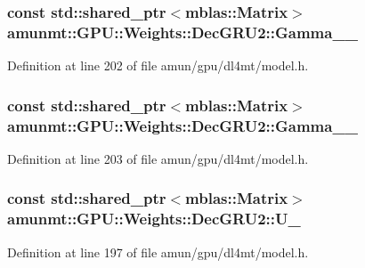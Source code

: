 \subsubsection[{\texorpdfstring{Gamma\+\_\+1\+\_\+}{Gamma_1_}}]{\setlength{\rightskip}{0pt plus 5cm}const std\+::shared\+\_\+ptr$<${\bf mblas\+::\+Matrix}$>$ amunmt\+::\+G\+P\+U\+::\+Weights\+::\+Dec\+G\+R\+U2\+::\+Gamma\+\_\+\_\+}\hypertarget{structamunmt_1_1GPU_1_1Weights_1_1DecGRU2_a7517c4142215998b349ea90128536778}{}\label{structamunmt_1_1GPU_1_1Weights_1_1DecGRU2_a7517c4142215998b349ea90128536778}


Definition at line 202 of file amun/gpu/dl4mt/model.\+h.

\subsubsection[{\texorpdfstring{Gamma\+\_\+2\+\_\+}{Gamma_2_}}]{\setlength{\rightskip}{0pt plus 5cm}const std\+::shared\+\_\+ptr$<${\bf mblas\+::\+Matrix}$>$ amunmt\+::\+G\+P\+U\+::\+Weights\+::\+Dec\+G\+R\+U2\+::\+Gamma\+\_\+\_\+}\hypertarget{structamunmt_1_1GPU_1_1Weights_1_1DecGRU2_a6f339692bf60f347ec717bd6adf249a3}{}\label{structamunmt_1_1GPU_1_1Weights_1_1DecGRU2_a6f339692bf60f347ec717bd6adf249a3}


Definition at line 203 of file amun/gpu/dl4mt/model.\+h.

\subsubsection[{\texorpdfstring{U\+\_\+}{U_}}]{\setlength{\rightskip}{0pt plus 5cm}const std\+::shared\+\_\+ptr$<${\bf mblas\+::\+Matrix}$>$ amunmt\+::\+G\+P\+U\+::\+Weights\+::\+Dec\+G\+R\+U2\+::\+U\+\_\+}\hypertarget{structamunmt_1_1GPU_1_1Weights_1_1DecGRU2_a276035b73c7ba0e85d103d17afcf0aa8}{}\label{structamunmt_1_1GPU_1_1Weights_1_1DecGRU2_a276035b73c7ba0e85d103d17afcf0aa8}


Definition at line 197 of file amun/gpu/dl4mt/model.\+h.

